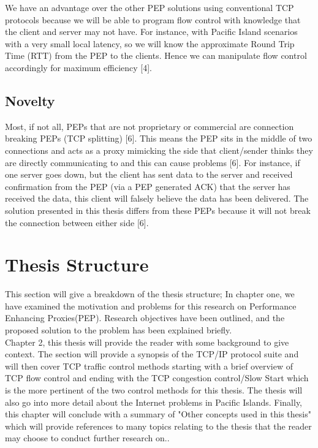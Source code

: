 \documentclass{uathesis}
\begin{document}
We have an advantage over the other PEP solutions using conventional TCP protocols because we will be able to program flow control with knowledge that the client and server may not have. For instance, with Pacific Island scenarios with a very small local latency, so we will know the approximate Round Trip Time (RTT) from the PEP to the clients. Hence we can manipulate flow control accordingly for maximum efficiency [4].

\subsection{Novelty} 
Most, if not all, PEPs that are not proprietary or commercial are connection breaking PEPs (TCP splitting) [6]. This means the PEP sits in the middle of two connections and acts as a proxy mimicking the side that client/sender thinks they are directly communicating to and this can cause problems [6]. For instance, if one server goes down, but the client has sent data to the server and received confirmation from the PEP (via a PEP generated ACK) that the server has received the data, this client will falsely believe the data has been delivered. The solution presented in this thesis differs from these PEPs because it will not break the connection between either side [6]. 

\section{Thesis Structure}
This section will give a breakdown of the thesis structure; In chapter one, we have examined the motivation and problems for this research on Performance Enhancing Proxies(PEP). Research objectives have been outlined, and the proposed solution to the problem has been explained briefly. \\

Chapter 2, this thesis will provide the reader with some background to give context. The section will provide a synopsis of the TCP/IP protocol suite and will then cover TCP traffic control methods starting with a brief overview of TCP flow control and ending with the TCP congestion control/Slow Start which is the more pertinent of the two control methods for this thesis. The thesis will also go into more detail about the Internet problems in Pacific Islands. Finally, this chapter will conclude with a summary of "Other concepts used in this thesis" which will provide references to many topics relating to the thesis that the reader may choose to conduct further research on..  \\
\end{document}

